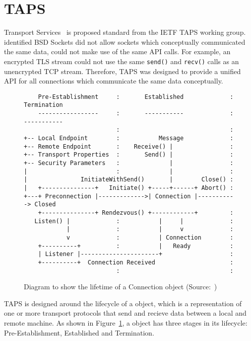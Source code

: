 \section{TAPS}\label{sec:taps}
Transport Services~\citep{pauly_architecturetransportservices_2020} is proposed standard from the IETF TAPS working
group.
\citet{pauly_architecturetransportservices_2020} identified BSD Sockets did not allow sockets which conceptually
communicated the same data, could not make use of the same API calls.
For example, an encrypted TLS stream could not use the same \texttt{send()} and \texttt{recv()} calls as an unencrypted
TCP stream.
Therefore, TAPS was designed to provide a unified API for all connections which communicate the same data conceptually.

\begin{figure}
    \begin{verbatim}
    Pre-Establishment     :       Established             : Termination
    -----------------     :       -----------             : -----------
                          :                               :
+-- Local Endpoint        :           Message             :
+-- Remote Endpoint       :    Receive() |                :
+-- Transport Properties  :       Send() |                :
+-- Security Parameters   :              |                :
|                         :              |                :
|               InitiateWithSend()       |        Close() :
|   +---------------+   Initiate() +-----+------+ Abort() :
+---+ Preconnection |------------->| Connection |-----------> Closed
    +---------------+ Rendezvous() +------------+         :
   Listen() |             :           |     |             :
            |             :           |     v             :
            v             :           | Connection        :
    +----------+          :           |   Ready           :
    | Listener |----------------------+                   :
    +----------+  Connection Received                     :
                          :                               :
    \end{verbatim}
    \caption{Diagram to show the lifetime of a Connection object
            (Source:~\citet[fig:4]{pauly_architecturetransportservices_2020})}
    \label{fig:tapsConLife}
\end{figure}

TAPS is designed around the lifecycle of a \connection{} object, which is a representation of one or more transport
protocols that send and recieve data between a local and remote machine.
As shown in Figure~\ref{fig:tapsConLife}, a \connection{} object has three stages in its lifecycle: Pre-Establishment,
Established and Termination.

